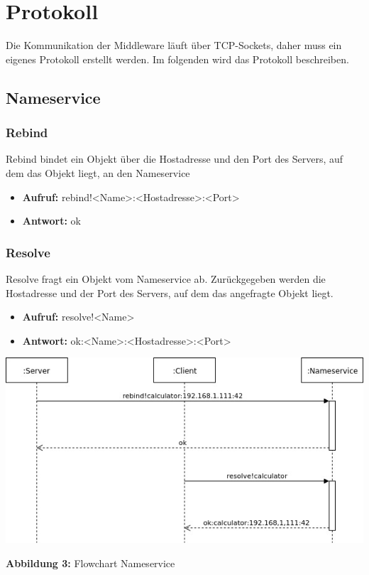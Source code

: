 \section{Protokoll}
Die Kommunikation der Middleware läuft über TCP-Sockets, daher muss ein eigenes Protokoll erstellt werden. Im folgenden wird das Protokoll beschreiben.

\subsection{Nameservice}
\subsubsection{Rebind}
Rebind bindet ein Objekt über die Hostadresse und den Port des Servers, auf dem das Objekt liegt, an den Nameservice
\begin{itemize}
\item \textbf{Aufruf:} rebind!<Name>:<Hostadresse>:<Port>
\item \textbf{Antwort:} ok
\end{itemize}

\subsubsection{Resolve}
Resolve fragt ein Objekt vom Nameservice ab. Zurückgegeben werden die Hostadresse und der Port des Servers, auf dem das angefragte Objekt liegt.
\begin{itemize}
\item \textbf{Aufruf:} resolve!<Name>
\item \textbf{Antwort:} ok:<Name>:<Hostadresse>:<Port>
\end{itemize}

\includegraphics[scale=0.7]{../pictures/FlowChartNameService.jpg}\\
\centerline{\textbf{Abbildung 3:} Flowchart Nameservice}\\

